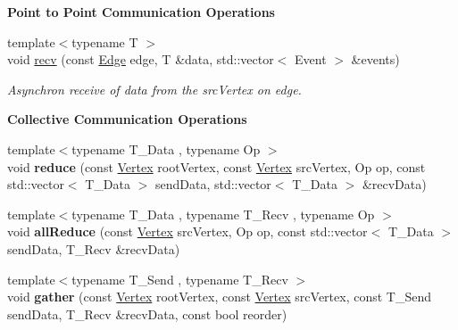 \begin{Indent}{\bf Point to Point Communication Operations}
\begin{DoxyCompactItemize}
\item 
{\footnotesize template$<$typename T $>$ }\\void \hyperlink{structgraybat_1_1Cage_a0c895e002001d07877f7dd311a3c279f}{recv} (const \hyperlink{structgraybat_1_1CommunicationEdge}{Edge} edge, T \&data, std\+::vector$<$ Event $>$ \&events)
\begin{DoxyCompactList}\small\item\em Asynchron receive of {\itshape data} from the {\itshape src\+Vertex} on {\itshape edge}. \end{DoxyCompactList}\end{DoxyCompactItemize}
\end{Indent}
\begin{Indent}{\bf Collective Communication Operations}\par
\begin{DoxyCompactItemize}
\item 
\hypertarget{structgraybat_1_1Cage_a36fa784cb2d80c8f18005729d1035fee}{}{\footnotesize template$<$typename T\+\_\+\+Data , typename Op $>$ }\\void {\bfseries reduce} (const \hyperlink{structgraybat_1_1CommunicationVertex}{Vertex} root\+Vertex, const \hyperlink{structgraybat_1_1CommunicationVertex}{Vertex} src\+Vertex, Op op, const std\+::vector$<$ T\+\_\+\+Data $>$ send\+Data, std\+::vector$<$ T\+\_\+\+Data $>$ \&recv\+Data)\label{structgraybat_1_1Cage_a36fa784cb2d80c8f18005729d1035fee}

\item 
\hypertarget{structgraybat_1_1Cage_aeaefc0dd7e23f1125dabcb9002ad45f2}{}{\footnotesize template$<$typename T\+\_\+\+Data , typename T\+\_\+\+Recv , typename Op $>$ }\\void {\bfseries all\+Reduce} (const \hyperlink{structgraybat_1_1CommunicationVertex}{Vertex} src\+Vertex, Op op, const std\+::vector$<$ T\+\_\+\+Data $>$ send\+Data, T\+\_\+\+Recv \&recv\+Data)\label{structgraybat_1_1Cage_aeaefc0dd7e23f1125dabcb9002ad45f2}

\item 
\hypertarget{structgraybat_1_1Cage_aa828d0331211a8388b21cee321d8edb9}{}{\footnotesize template$<$typename T\+\_\+\+Send , typename T\+\_\+\+Recv $>$ }\\void {\bfseries gather} (const \hyperlink{structgraybat_1_1CommunicationVertex}{Vertex} root\+Vertex, const \hyperlink{structgraybat_1_1CommunicationVertex}{Vertex} src\+Vertex, const T\+\_\+\+Send send\+Data, T\+\_\+\+Recv \&recv\+Data, const bool reorder)\label{structgraybat_1_1Cage_aa828d0331211a8388b21cee321d8edb9}


\end{DoxyCompactItemize}
\end{Indent}

